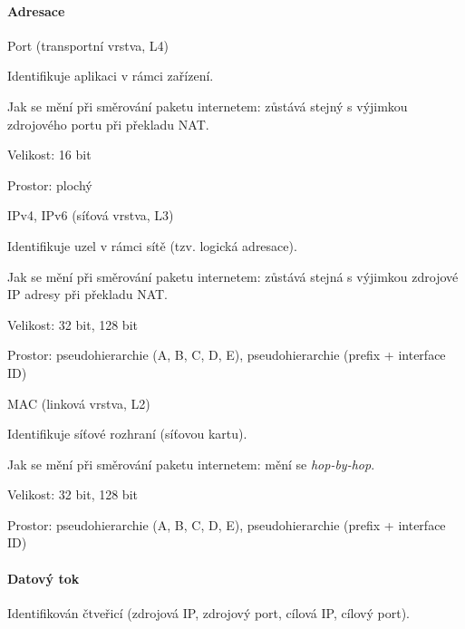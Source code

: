\paragraph*{Adresace} \begin{compactitem}
    \item Port (transportní vrstva, L4) \begin{compactitem}
        \item Identifikuje aplikaci v rámci zařízení.
        \item Jak se mění při směrování paketu internetem: zůstává stejný s výjimkou zdrojového portu při překladu NAT.
        \item Velikost: 16 bit
        \item Prostor: plochý
    \end{compactitem}
    \item IPv4, IPv6 (síťová vrstva, L3) \begin{compactitem}
        \item Identifikuje uzel v rámci sítě (tzv. logická adresace).
        \item Jak se mění při směrování paketu internetem: zůstává stejná s výjimkou zdrojové IP adresy při překladu NAT.
        \item Velikost: 32 bit, 128 bit
        \item Prostor: pseudohierarchie (A, B, C, D, E), pseudohierarchie (prefix + interface ID)
    \end{compactitem}
    \item MAC (linková vrstva, L2) \begin{compactitem}
        \item Identifikuje síťové rozhraní (síťovou kartu).
        \item Jak se mění při směrování paketu internetem: mění se \textit{hop-by-hop}.
        \item Velikost: 32 bit, 128 bit
        \item Prostor: pseudohierarchie (A, B, C, D, E), pseudohierarchie (prefix + interface ID)
    \end{compactitem}
\end{compactitem}

\paragraph*{Datový tok} Identifikován čtveřicí (zdrojová IP, zdrojový port, cílová IP, cílový port).

